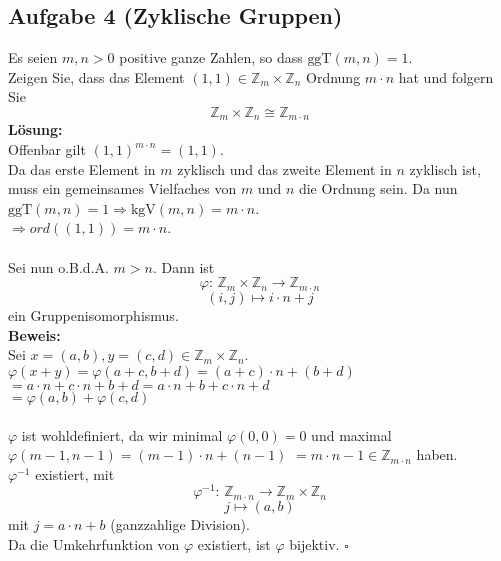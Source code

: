 \documentclass[11pt,a4paper,ngerman]{article}
\newcommand{\Z}{\mathbb{Z}}
\newcommand{\ggT}{\text{ggT}}
\newcommand{\kgV}{\text{kgV}}
\begin{document}
\subsection*{Aufgabe 4 \mdseries (Zyklische Gruppen)}
Es seien $m, n > 0$ positive ganze Zahlen, so dass $\ggT(m,n) = 1$. \\
Zeigen Sie, dass das Element $(1,1) \in \Z_m \times \Z_n$ Ordnung $m\cdot n$ hat und folgern Sie
$$ \Z_m \times \Z_n \cong \Z_{m\cdot n} $$
\textbf{Lösung:}\\
Offenbar gilt $(1,1)^{m \cdot n} = (1,1)$. \\
Da das erste Element in $m$ zyklisch und das zweite Element in $n$ zyklisch ist, muss ein gemeinsames Vielfaches von $m$ und $n$ die Ordnung sein. Da nun $\ggT(m,n) = 1 \Rightarrow \kgV(m,n) = m \cdot n$. \\
$ \Rightarrow ord((1,1)) = m\cdot n $.
\\ \\
Sei nun o.B.d.A. $m > n$. Dann ist
$$ \varphi : \, \Z_m \times \Z_n \to \Z_{m\cdot n} $$
$$ (i,j) \mapsto i \cdot n + j $$
ein Gruppenisomorphismus.
\\
\textbf{Beweis:}\\
Sei $x=(a,b),y=(c,d) \in \Z_m \times \Z_n$. \\
$ \varphi (x + y) = \varphi (a+c,b+d) = (a+c) \cdot n + (b+d) $ \\
$ = a \cdot n + c \cdot n + b + d = a \cdot n + b + c \cdot n + d$ \\
$ = \varphi(a,b) + \varphi(c,d)$ \\
\\
$\varphi$ ist wohldefiniert, da wir minimal $\varphi(0,0) = 0$ und maximal $\varphi(m-1,n-1) = (m-1) \cdot n + (n-1)$ $ = m \cdot n - 1 \in \Z_{m\cdot n}$ haben. \\
$\varphi^{-1}$ existiert, mit
$$ \varphi^{-1} : \, \Z_{m\cdot n} \to \Z_m \times \Z_n$$
$$ j \mapsto (a,b) $$
mit $j = a \cdot n + b$ (ganzzahlige Division). \\
Da die Umkehrfunktion von $\varphi$ existiert, ist $\varphi$ bijektiv.
\mbox{} \hfill $\square$\\

\label{LastPage}
\end{document}

